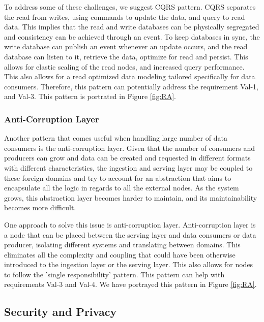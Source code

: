 \documentclass[a4paper,11pt,article,oneside]{memoir}
\begin{document}
To address some of these challenges, we suggest CQRS pattern. CQRS separates the read from writes, using commands to update the data, and query to read data. This implies that the read and write databases can be physically segregated and consistency can be achieved through an event. To keep databases in sync, the write database can publish an event whenever an update occurs, and the read database can listen to it, retrieve the data, optimize for  read and persist. This allows for elastic scaling of the read nodes, and increased query performance. This also allows for a read optimized data modeling tailored specifically for data consumers. Therefore, this pattern can potentially address the requirement Val-1, and Val-3. This pattern is portrated in Figure \ref{fig:RA}.

\subsubsection{Anti-Corruption Layer}

Another pattern that comes useful when handling large number of data consumers is the anti-corruption layer. Given that the number of consumers and producers can grow and data can be created and requested in different formats with different characteristics, the ingestion and serving layer may be coupled to these foreign domains and try to account for an abstraction that aims to encapsulate all the logic in regards to all the external nodes. As the system grows, this abstraction layer becomes harder to maintain, and its maintainability becomes more difficult. 

One approach to solve this issue is anti-corruption layer. Anti-corruption layer is a node that can be placed between the serving layer and data consumers or data producer, isolating different systems and translating between domains. This eliminates all the complexity and coupling that could have been otherwise introduced to the ingestion layer or the serving layer. This also allows for nodes to follow the 'single responsibility' pattern. This pattern can help with requirements Val-3 and Val-4. We have portrayed this pattern in Figure \ref{fig:RA}.


\subsection{Security and Privacy}
\end{document}
